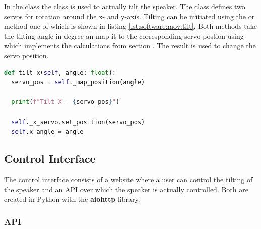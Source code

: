 %
In the class  the  class is used to actually tilt the speaker. The class defines two servos for rotation around the x- and y-axis. Tilting can be initiated using the  or  method one of which is shown in listing \ref{lst:software:mov:tilt}. Both methods take the tilting angle in degree an map it to the corresponding servo postion using  which implements the calculations from section . The result is used to change the servo position.
%
\begin{mdframed}
\begin{lstlisting}[language=python, caption=Method for titling the speaker around the x-axis, label=lst:software:mov:tilt]
def tilt_x(self, angle: float):
  servo_pos = self._map_position(angle)

  print(f"Tilt X - {servo_pos}")

  self._x_servo.set_position(servo_pos)
  self.x_angle = angle
\end{lstlisting}
\end{mdframed}

\subsection{Control Interface}
%
The control interface consists of a website where a user can control the tilting of the speaker and an API over which the speaker is actually controlled. Both are created in Python with the \textbf{aiohttp} library.\cite{noauthor_aiohttp_nodate}

\subsubsection*{API}

